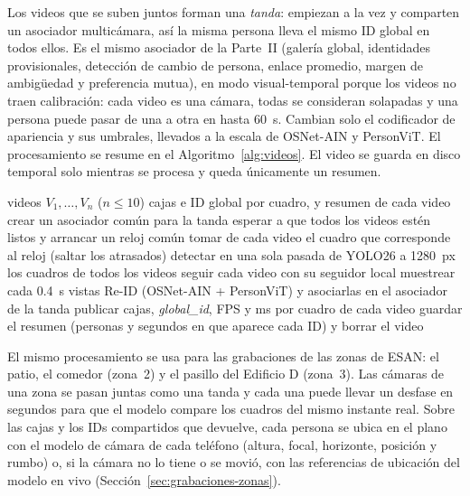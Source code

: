 \documentclass[12pt,a4paper]{article}
\begin{document}
Los videos que se suben juntos forman una \textit{tanda}: empiezan a la vez y
comparten un asociador multicámara, así la misma persona lleva el mismo ID
global en todos ellos. Es el mismo asociador de la Parte~II (galería global,
identidades provisionales, detección de cambio de persona, enlace promedio,
margen de ambigüedad y preferencia mutua), en modo visual-temporal porque los
videos no traen calibración: cada video es una cámara, todas se consideran
solapadas y una persona puede pasar de una a otra en hasta 60~s. Cambian solo
el codificador de apariencia y sus umbrales, llevados a la escala de
OSNet-AIN y PersonViT. El procesamiento se resume en el Algoritmo~\ref{alg:videos}. El video se guarda en disco temporal solo
mientras se procesa y queda únicamente un resumen.

\begin{algorithm}[H]
\caption{Procesamiento de una tanda de videos}
\label{alg:videos}
\begin{algorithmic}[1]
\REQUIRE videos $V_1,\dots,V_n$ ($n \leq 10$)
\ENSURE cajas e ID global por cuadro, y resumen de cada video
\STATE crear un asociador común para la tanda
\STATE esperar a que todos los videos estén listos y arrancar un reloj común
  \STATE tomar de cada video el cuadro que corresponde al reloj (saltar los atrasados)
  \STATE detectar en una sola pasada de YOLO26 a 1280~px los cuadros de todos los videos
  \STATE seguir cada video con su seguidor local
  \STATE muestrear cada 0.4~s vistas Re-ID (OSNet-AIN + PersonViT) y asociarlas en el asociador de la tanda
  \STATE publicar cajas, \textit{global\_id}, FPS y ms por cuadro de cada video
\ENDWHILE
\STATE guardar el resumen (personas y segundos en que aparece cada ID) y borrar el video
\end{algorithmic}
\end{algorithm}

El mismo procesamiento se usa para las grabaciones de las zonas de ESAN: el
patio, el comedor (zona~2) y el pasillo del Edificio D (zona~3). Las cámaras
de una zona se pasan juntas como una tanda y cada una puede llevar un desfase en segundos para que el modelo compare los
cuadros del mismo instante real. Sobre las cajas y los IDs compartidos que
devuelve, cada persona se ubica en el plano con el modelo de cámara de cada
teléfono (altura, focal, horizonte, posición y rumbo) o, si la cámara no lo
tiene o se movió, con las referencias de ubicación del modelo en vivo
(Sección~\ref{sec:grabaciones-zonas}).
\end{document}
